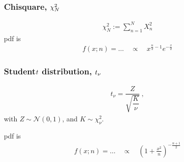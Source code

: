 \documentclass[letterpaper,10pt,english]{jupyterBook}
\begin{document}
\subsubsection{Chi\sphinxhyphen{}square, \protect\(\chi_N^2\protect\)}
\label{\detokenize{ch/prob/rv-continuous:chi-square-chi-n-2}}\label{\detokenize{ch/prob/rv-continuous:prob-rv-continuous-ex-chi-2}}\begin{equation*}
\begin{split}\chi_N^2 := \sum_{n=1}^N X^2_n\end{split}
\end{equation*}
\sphinxAtStartPar
pdf is
\begin{equation*}
\begin{split}f(x; n) = \dots \quad \propto \quad  x^{\frac{n}{2} - 1} e^{- \frac{x}{2}} \end{split}
\end{equation*}

\subsubsection{Student\sphinxhyphen{}\protect\(t\protect\) distribution, \protect\(t_{\nu}\protect\)}
\label{\detokenize{ch/prob/rv-continuous:student-t-distribution-t-nu}}\label{\detokenize{ch/prob/rv-continuous:prob-rv-continuous-ex-t-student}}\begin{equation*}
\begin{split}t_{\nu} = \dfrac{Z}{\sqrt{\dfrac{K}{\nu}}} \ ,\end{split}
\end{equation*}
\sphinxAtStartPar
with \(Z \sim \mathscr{N}(0,1)\), and \(K \sim \chi^2_\nu\).

\sphinxAtStartPar
pdf is
\begin{equation*}
\begin{split}f(x; n) = \dots \quad \propto \quad \left( 1 + \frac{x^2}{n} \right)^{-\frac{n+1}{2}} \end{split}
\end{equation*}
\sphinxstepscope
\end{document}

